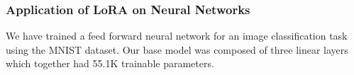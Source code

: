 \documentclass{beamer}
\begin{document}
    \begin{frame}
        \frametitle{Application of LoRA on Neural Networks}
        We have trained a feed forward neural network for an image classification task using the MNIST dataset. Our base model was composed of three linear layers which together had 55.1K trainable parameters.
    \end{frame}
\end{document}
